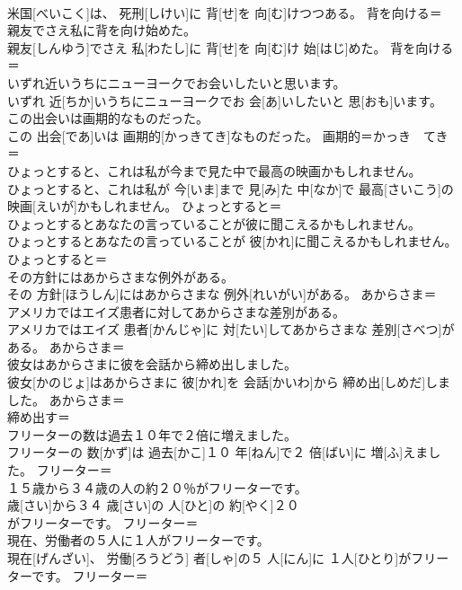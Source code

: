 \documentclass[8pt]{extreport}
\begin{document}
\begin{CJK}{UTF8}{min}
\\	米国[べいこく]は、 死刑[しけい]に 背[せ]を 向[む]けつつある。	背を向ける＝ 
\\	親友でさえ私に背を向け始めた。	
\\	親友[しんゆう]でさえ 私[わたし]に 背[せ]を 向[む]け 始[はじ]めた。	背を向ける＝ 
\\	いずれ近いうちにニューヨークでお会いしたいと思います。	
\\	いずれ 近[ちか]いうちにニューヨークでお 会[あ]いしたいと 思[おも]います。	
\\	この出会いは画期的なものだった。	
\\	この 出会[であ]いは 画期的[かっきてき]なものだった。	画期的＝かっき　てき＝ 
\\	ひょっとすると、これは私が今まで見た中で最高の映画かもしれません。	
\\	ひょっとすると、これは私が 今[いま]まで 見[み]た 中[なか]で 最高[さいこう]の 映画[えいが]かもしれません。	ひょっとすると＝ 
\\	ひょっとするとあなたの言っていることが彼に聞こえるかもしれません。	
\\	ひょっとするとあなたの言っていることが 彼[かれ]に聞こえるかもしれません。	ひょっとすると＝ 
\\	その方針にはあからさまな例外がある。	
\\	その 方針[ほうしん]にはあからさまな 例外[れいがい]がある。	あからさま＝ 
\\	アメリカではエイズ患者に対してあからさまな差別がある。	
\\	アメリカではエイズ 患者[かんじゃ]に 対[たい]してあからさまな 差別[さべつ]がある。	あからさま＝ 
\\	彼女はあからさまに彼を会話から締め出しました。	
\\	彼女[かのじょ]はあからさまに 彼[かれ]を 会話[かいわ]から 締め出[しめだ]しました。	あからさま＝ 
\\	締め出す＝ 
\\	フリーターの数は過去１０年で２倍に増えました。	
\\	フリーターの 数[かず]は 過去[かこ]１０ 年[ねん]で２ 倍[ばい]に 増[ふ]えました。	フリーター＝ 
\\	１５歳から３４歳の人の約２０％がフリーターです。	
\\	歳[さい]から３４ 歳[さい]の 人[ひと]の 約[やく]２０ 
\\	[ぱーせんと]がフリーターです。	フリーター＝ 
\\	現在、労働者の５人に１人がフリーターです。	
\\	現在[げんざい]、 労働[ろうどう] 者[しゃ]の５ 人[にん]に １人[ひとり]がフリーターです。	フリーター＝ 

\end{CJK}
\end{document}
